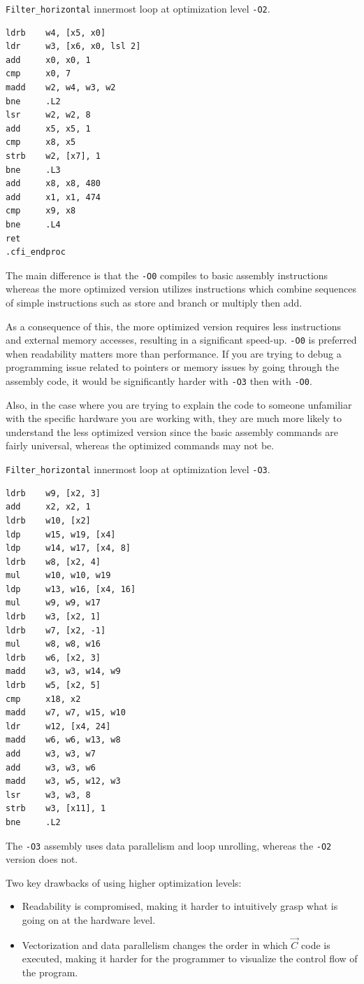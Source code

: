 \documentclass[
  course = {{ESE532 System-on-a-Chip}},
  quartile = {{}},
  assignment = 4,
  name = {{Sheil Sarda, Kate Ballard}},
  studentnumber = {{}},
  email = {{sheils@seas.upenn.edu, kballard@seas.upenn.edu}},
  firstexercise = 1
]{aga-homework}
\begin{document}
\subexercise \verb|Filter_horizontal| innermost loop at optimization level \verb|-O2|.
\begin{verbatim}
ldrb    w4, [x5, x0]
ldr     w3, [x6, x0, lsl 2]
add     x0, x0, 1
cmp     x0, 7
madd    w2, w4, w3, w2
bne     .L2
lsr     w2, w2, 8
add     x5, x5, 1
cmp     x8, x5
strb    w2, [x7], 1
bne     .L3
add     x8, x8, 480
add     x1, x1, 474
cmp     x9, x8
bne     .L4
ret
.cfi_endproc
\end{verbatim}

\subexercise
The main difference is that the \verb|-O0| compiles to basic assembly instructions whereas the more optimized version utilizes instructions which combine sequences of simple instructions such as store and branch or multiply then add.

As a consequence of this, the more optimized version requires less instructions and external memory accesses, resulting in a significant speed-up.
\subexercise
\verb|-O0| is preferred when readability matters more than performance. If you are trying to debug a programming issue related to pointers or memory issues by going through the assembly code, it would be significantly harder with \verb|-O3| then with \verb|-O0|.

Also, in the case where you are trying to explain the code to someone unfamiliar with the specific hardware you are working with, they are much more likely to understand the less optimized version since the basic assembly commands are fairly universal, whereas the optimized commands may not be.

\subexercise \verb|Filter_horizontal| innermost loop at optimization level \verb|-O3|.
\begin{verbatim}
ldrb    w9, [x2, 3]
add     x2, x2, 1
ldrb    w10, [x2]
ldp     w15, w19, [x4]
ldp     w14, w17, [x4, 8]
ldrb    w8, [x2, 4]
mul     w10, w10, w19
ldp     w13, w16, [x4, 16]
mul     w9, w9, w17
ldrb    w3, [x2, 1]
ldrb    w7, [x2, -1]
mul     w8, w8, w16
ldrb    w6, [x2, 3]
madd    w3, w3, w14, w9
ldrb    w5, [x2, 5]
cmp     x18, x2
madd    w7, w7, w15, w10
ldr     w12, [x4, 24]
madd    w6, w6, w13, w8
add     w3, w3, w7
add     w3, w3, w6
madd    w3, w5, w12, w3
lsr     w3, w3, 8
strb    w3, [x11], 1
bne     .L2
\end{verbatim}

\subexercise
The \verb|-O3| assembly uses data parallelism and loop unrolling, whereas the \verb|-O2| version does not.

\subexercise Two key drawbacks of using higher optimization levels:
\begin{itemize}
	\item Readability is compromised, making it harder to intuitively grasp what is going on at the hardware level.
	\item Vectorization and data parallelism changes the order in which $\vec{C}$ code is executed, making it harder for the programmer to visualize the control flow of the program.
\end{itemize}
\end{document}
